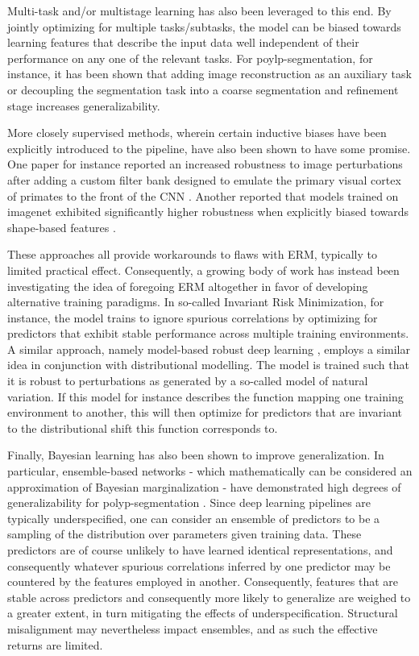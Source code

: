 	Multi-task and/or multistage learning has also been leveraged to this end. By jointly optimizing for multiple tasks/subtasks, the model can be biased towards learning features that describe the input data well independent of their performance on any one of the relevant tasks. For poylp-segmentation, for instance, it has been shown that adding image reconstruction as an auxiliary task \cite{ddanet} or decoupling the segmentation task into a coarse segmentation and refinement stage \cite{doubleencdec} increases generalizability. 

	More closely supervised methods, wherein certain inductive biases have been explicitly introduced to the pipeline, have also been shown to have some promise. One paper for instance reported an increased robustness to image perturbations after adding a custom filter bank designed to emulate the primary visual cortex of primates to the front of the CNN \cite{visual_cortex}. Another reported that models trained on imagenet exhibited significantly higher robustness when explicitly biased towards shape-based features \cite{texturebias}. 
	
		
	These approaches all provide workarounds to flaws with ERM, typically to limited practical effect. Consequently, a growing body of work has instead been investigating the idea of foregoing ERM altogether in favor of developing alternative training paradigms. In so-called Invariant Risk Minimization\cite{IRM}, for instance, the model trains to ignore spurious correlations by optimizing for predictors that exhibit stable performance across multiple training environments. A similar approach, namely model-based robust deep learning \cite{modelbased}, employs a similar idea in conjunction with distributional modelling. The model is trained such that it is robust to perturbations as generated by a so-called model of natural variation. If this model for instance describes the function mapping one training environment to another, this will then optimize for predictors that are invariant to the distributional shift this function corresponds to. 

	Finally, Bayesian learning has also been shown to improve generalization. In particular, ensemble-based networks - which mathematically can be considered an approximation of Bayesian marginalization \cite{bayesian_case,bayesian_generalization} - have demonstrated high degrees of generalizability for polyp-segmentation \cite{divergentnets,endoensemble}. Since deep learning pipelines are typically underspecified, one can consider an ensemble of predictors to be a sampling of the distribution over parameters given training data. These predictors are of course unlikely to have learned identical representations, and consequently whatever spurious correlations inferred by one predictor may be countered by the features employed in another. Consequently, features that are stable across predictors and consequently more likely to generalize are weighed to a greater extent, in turn mitigating the effects of underspecification. Structural misalignment may nevertheless impact ensembles, and as such the effective returns are limited. 


